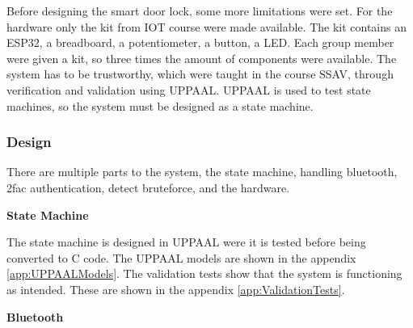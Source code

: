 \begin{comment}
To create design for the Statemachine, UPPAAL is a software used to show the different states and varify the system validation. It uses Nodes and edges to determine which relations each states can traverse to other states using conecepts like gaurds and invariance to introduce logical components for statemachine is working as intended \cite{UPPAAL:UPPAAL}. 


1 https://www.bluetooth.com/specifications/specs/serial-port-profile-1-1/\\
2 https://learn.adafruit.com/introduction-to-bluetooth-low-energy/gatt\\
3 https://www.bluetooth.com/learn-about-bluetooth/tech-overview/\\
\end{comment}

Before designing the smart door lock, some more limitations were set.
For the hardware only the kit from IOT course were made available.
The kit contains an ESP32, a breadboard, a potentiometer, a button, a LED.
Each group member were given a kit, so three times the amount of components were available.
The system has to be trustworthy, which were taught in the course SSAV, through verification and validation using UPPAAL.
UPPAAL is used to test state machines, so the system must be designed as a state machine.

\subsubsection{Design}\label{sec:Design}

There are multiple parts to the system, the state machine, handling bluetooth, 2fac authentication, detect bruteforce, and the hardware.

\textbf{State Machine}

The state machine is designed in UPPAAL were it is tested before being converted to C code.
The UPPAAL models are shown in the appendix \ref{app:UPPAALModels}.
The validation tests show that the system is functioning as intended.
These are shown in the appendix \ref{app:ValidationTests}.

\textbf{Bluetooth}

